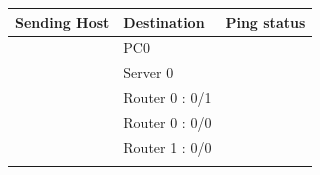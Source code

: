 \documentclass[a4paper,11pt]{article}
\begin{document}
\begin{enumerate}
\begin{enumerate}
                    \begin{table}[H]
                        \centering
                        \begin{tabular}{| m{9em}| m{12em}| m{9em} |}
                            \hline
                            \textbf{Sending Host}                                                & \textbf{Destination} & \textbf{Ping status}                                                     \\
                            \hline
                            {\cellcolor[rgb]{0.333,0.686,1}}                                     & PC0                  & {\cellcolor[rgb]{0.365,1,0.741}}                                         \\
                            \hhline{|>{\arrayrulecolor[rgb]{0.333,0.686,1}}->{\arrayrulecolor{black}}->{\arrayrulecolor[rgb]{0.365,1,0.741}}->{\arrayrulecolor{black}}|}
                            {\cellcolor[rgb]{0.333,0.686,1}}                                     & Server 0             & {\cellcolor[rgb]{0.365,1,0.741}}                                         \\
                            \hhline{|>{\arrayrulecolor[rgb]{0.333,0.686,1}}->{\arrayrulecolor{black}}->{\arrayrulecolor[rgb]{0.365,1,0.741}}->{\arrayrulecolor{black}}|}
                            {\cellcolor[rgb]{0.333,0.686,1}}                                     & Router 0 : 0/1       & {\cellcolor[rgb]{0.365,1,0.741}}                                         \\
                            \hhline{|>{\arrayrulecolor[rgb]{0.333,0.686,1}}->{\arrayrulecolor{black}}->{\arrayrulecolor[rgb]{0.365,1,0.741}}->{\arrayrulecolor{black}}|}
                            {\cellcolor[rgb]{0.333,0.686,1}}                                     & Router 0 : 0/0       & {\cellcolor[rgb]{0.365,1,0.741}}                                         \\
                            \hhline{|>{\arrayrulecolor[rgb]{0.333,0.686,1}}->{\arrayrulecolor{black}}->{\arrayrulecolor[rgb]{0.365,1,0.741}}->{\arrayrulecolor{black}}|}
                            {\cellcolor[rgb]{0.333,0.686,1}}                                     & Router 1 : 0/0       & {\cellcolor[rgb]{0.365,1,0.741}}                                         \\
                            \hhline{|>{\arrayrulecolor[rgb]{0.333,0.686,1}}->{\arrayrulecolor{black}}->{\arrayrulecolor[rgb]{0.365,1,0.741}}->{\arrayrulecolor{black}}|}

\end{tabular}
\end{table}
\end{enumerate}
\end{enumerate}
\end{document}
